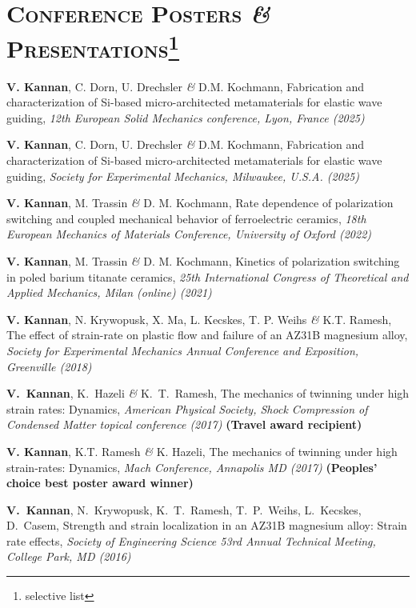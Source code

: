 \documentclass[a4paper,10pt, oneside]{article}
\begin{document}
	\section*{\large\textsc{Conference Posters \emph{\&} Presentations}\footnote[2]{selective list}}
	\begin{enumerate}[label={[\arabic*]}, leftmargin=*]
		\itemsep 5pt
		\item \textbf{V. Kannan}, C. Dorn, U. Drechsler \emph{\&} D.M. Kochmann, Fabrication and characterization of Si-based
		micro-architected metamaterials for elastic wave guiding, \textit{12th European Solid Mechanics conference, Lyon, France (2025)}
		\item \textbf{V. Kannan}, C. Dorn, U. Drechsler \emph{\&} D.M. Kochmann, Fabrication and characterization of Si-based
		micro-architected metamaterials for elastic wave guiding, \textit{Society for Experimental Mechanics, Milwaukee, U.S.A. (2025)}
		\item \textbf{V. Kannan}, M. Trassin \emph{\&} D. M. Kochmann, Rate dependence of polarization switching and coupled mechanical behavior of ferroelectric ceramics, \textit{18th European Mechanics of Materials Conference, University of Oxford (2022)}
		\item \textbf{V. Kannan}, M. Trassin \emph{\&} D. M. Kochmann, Kinetics of polarization switching in poled barium titanate ceramics, \textit{25th International Congress of Theoretical and Applied Mechanics, Milan (online) (2021)}
		\item \textbf{V. Kannan}, N. Krywopusk, X. Ma, L. Kecskes, T. P. Weihs \emph{\&} K.T. Ramesh, The effect of strain-rate on plastic flow and failure of an AZ31B magnesium alloy, \textit{Society for Experimental Mechanics Annual Conference and Exposition, Greenville (2018)}
		\item \textbf{V.~Kannan}, K.~Hazeli \emph{\&} K.~T.~Ramesh, The mechanics of twinning under high strain rates: Dynamics, \textit{American Physical Society, Shock Compression of Condensed Matter topical conference (2017)}  \textbf{(Travel award recipient)}
		\item \textbf{V. Kannan}, K.T. Ramesh \emph{\&} K. Hazeli, The mechanics of twinning under high strain-rates: Dynamics, \textit{Mach Conference, Annapolis MD (2017)} \textbf{{{(Peoples' choice best poster award winner)}}}
		\item \textbf{V.~Kannan}, N.~Krywopusk, K.~T.~Ramesh, T.~P.~Weihs, L.~Kecskes, D.~Casem, Strength and strain localization in an AZ31B magnesium alloy: Strain rate effects, \textit{Society of Engineering Science 53rd Annual Technical Meeting, College Park, MD (2016)}

\end{enumerate}
\end{document}
